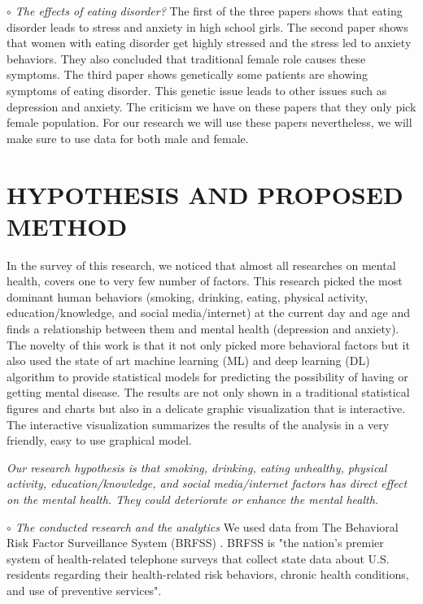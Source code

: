 \documentclass[letterpaper, 10 pt, conference]{ieeeconf}  %
\begin{document}
\par\noindent\textit{$\circ$ The effects of eating disorder?}\newline
The first of the three papers \cite{sassaroli2005role} shows that eating disorder leads to stress and anxiety in 
high school girls. The second paper \cite{martz1995relationship} shows that women with eating disorder 
get highly stressed and the stress led to anxiety behaviors. They also concluded that 
traditional female role causes these symptoms. The third paper \cite{striegel2007risk} shows genetically 
some patients are showing symptoms of eating disorder. This genetic issue leads 
to other issues such as depression and anxiety. The criticism we have on these papers that they only pick 
female population. For our research we will use 
these papers nevertheless, we will make sure to use data for both male and female.  

\setlength{\parskip}{.5em} %
\section{HYPOTHESIS AND PROPOSED METHOD}
In the survey of this research, we noticed that almost all researches on mental health, covers one to very few 
number of factors. This research picked the most dominant human behaviors (smoking, drinking, eating, physical activity, 
education/knowledge, and social media/internet) at the current day and age and finds a relationship between 
them and mental health (depression and anxiety). The novelty of this work is that it not only picked more behavioral 
factors but it also used the state of art machine learning (ML) and deep learning (DL) algorithm to provide statistical models for predicting 
the possibility of having or getting mental disease. The results are not only shown in a traditional statistical 
figures and charts but also in a delicate graphic visualization that 
is interactive. The interactive visualization summarizes the results of the analysis in a very friendly, easy to use graphical model.

\noindent\textit{Our research hypothesis is that smoking, drinking, eating unhealthy, physical activity, 
education/knowledge, and social media/internet factors has direct effect on the mental health. They could deteriorate or
enhance the mental health.}

\par\noindent\textit{$\circ$ The conducted research and the analytics}\newline
We used data from The Behavioral Risk Factor Surveillance System (BRFSS) \cite{brfss}.
BRFSS is "the nation's premier system of health-related 
telephone surveys that collect state data about U.S. residents regarding their health-related risk behaviors, 
chronic health conditions, and use of preventive services"\cite{brfss}.
\end{document}
